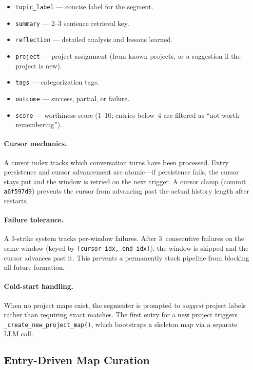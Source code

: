 \documentclass[11pt,a4paper]{article}
\newcommand{\code}[1]{\texttt{#1}}
\begin{document}
\begin{itemize}[nosep]
  \item \code{topic\_label} --- concise label for the segment.
  \item \code{summary} --- 2--3 sentence retrieval key.
  \item \code{reflection} --- detailed analysis and lessons learned.
  \item \code{project} --- project assignment (from known projects, or
        a suggestion if the project is new).
  \item \code{tags} --- categorization tags.
  \item \code{outcome} --- success, partial, or failure.
  \item \code{score} --- worthiness score (1--10; entries below~4 are
        filtered as ``not worth remembering'').
\end{itemize}

\paragraph{Cursor mechanics.}
A cursor index tracks which conversation turns have been processed.
Entry persistence and cursor advancement are atomic---if persistence
fails, the cursor stays put and the window is retried on the next
trigger. A cursor clamp (commit \code{a6f597d9}) prevents the cursor
from advancing past the actual history length after restarts.

\paragraph{Failure tolerance.}
A 3-strike system tracks per-window failures. After 3~consecutive
failures on the same window (keyed by \code{(cursor\_idx, end\_idx)}),
the window is skipped and the cursor advances past it. This prevents
a permanently stuck pipeline from blocking all future formation.

\paragraph{Cold-start handling.}
When no project maps exist, the segmenter is prompted to \emph{suggest}
project labels rather than requiring exact matches. The first entry
for a new project triggers \code{\_create\_new\_project\_map()}, which
bootstraps a skeleton map via a separate LLM call.

\subsection{Entry-Driven Map Curation}
\label{sec:map-curation}
\end{document}
